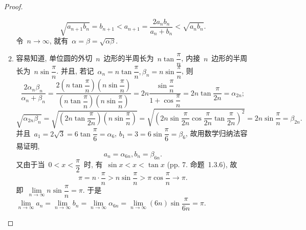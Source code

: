 \documentclass[UTF8,a4paper,11pt,twoside]{book}
\begin{document}
\begin{enumerate}
\begin{proof}
\begin{enumerate}[(1)]
			            \[
				            \sqrt{a_{n+1}b_n}=b_{n+1}<a_{n+1}=\dfrac{2a_nb_n}{a_n+b_n}<\sqrt{a_nb_n}.
			            \]
			            令~$n\to\infty$, 就有~$\alpha=\beta=\sqrt{\alpha\beta}$.
			      \item 容易知道, 单位圆的外切~$n$~边形的半周长为~$n\tan{\dfrac{\pi}{n}}$, 内接~$n$~边形的半周长为~$n\sin{\dfrac{\pi}{n}}$. 并且, 若记~$\alpha_n=n\tan{\dfrac{\pi}{n}}, \beta_n=n\sin{\dfrac{\pi}{n}}$, 则
			            \[
				            \dfrac{2\alpha_n\beta_n}{\alpha_n+\beta_n}=\dfrac{2\left(n\tan{\dfrac{\pi}{n}}\right)\left(n\sin{\dfrac{\pi}{n}}\right)}{\left(n\tan{\dfrac{\pi}{n}}\right)\left(n\sin{\dfrac{\pi}{n}}\right)}=2n\dfrac{\sin{\dfrac{\pi}{n}}}{1+\cos{\dfrac{\pi}{n}}}=2n\tan{\dfrac{\pi}{2n}}=\alpha_{2n};
			            \]
			            \[
				            \sqrt{\alpha_{2n}\beta_n}=\sqrt{\left(2n\tan{\dfrac{\pi}{2n}}\right)\left(n\sin{\dfrac{\pi}{n}}\right)}=\sqrt{\left(2n\sin{\dfrac{\pi}{2n}}\cos{\dfrac{\pi}{2n}}\tan{\dfrac{\pi}{2n}}\right)^2}=2n\sin{\dfrac{\pi}{n}}=\beta_{2n}.
			            \]
			            并且~$a_1=2\sqrt{3}=6\tan{\dfrac{\pi}{6}}=\alpha_6$, $b_1=3=6\sin{\dfrac{\pi}{6}}=\beta_6$, 故用数学归纳法容易证明,
			            \[
				            a_n=\alpha_{6n}, b_n=\beta_{6n}.
			            \]
			            又由于当~$0<x<\dfrac{\pi}{2}$~时, 有~$\sin{x}<x<\tan{x}$ (pp. 7. 命题~1.3.6), 故
			            \[
				            \pi=n\cdot\dfrac{\pi}{n}>n\sin{\dfrac{\pi}{n}}>\pi\cos{\dfrac{\pi}{n}}\to\pi.
			            \]
			            即~$\lim\limits_{n\to\infty} n\sin{\dfrac{\pi}{n}}=\pi$. 于是~$\lim\limits_{n\to\infty} a_n=\lim\limits_{n\to\infty} b_n=\lim\limits_{n\to\infty} \alpha_{6n}=\lim\limits_{n\to\infty} (6n)\sin{\dfrac{\pi}{6n}}=\pi$. \qedhere
		      \end{enumerate}
	      \end{proof}
\end{enumerate}
\end{document}
